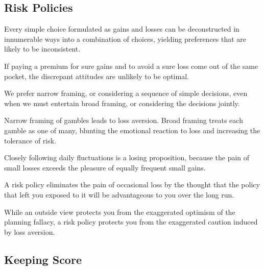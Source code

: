 \subsection*{Risk Policies}

\bit
\item Every simple choice formulated as gains and losses can be deconstructed in innumerable ways into a combination
of choices, yielding preferences that are likely to be inconsistent.
\item If paying a premium for sure gains and to avoid a sure loss come out of the same pocket, the discrepant
attitudes are unlikely to be optimal.
\item We prefer narrow framing, or considering a sequence of simple decisions, even when we must entertain broad
framing, or considering the decisions jointly.
\item Narrow framing of gambles leads to loss aversion. Broad framing treats each gamble as one of many, blunting the
emotional reaction to loss and increasing the tolerance of risk.
\item Closely following daily fluctuations is a losing proposition, because the pain of small losses exceeds the
pleasure of equally frequent small gains.
\item A risk policy eliminates the pain of occasional loss by the thought that the policy that left you exposed to it
will be advantageous to you over the long run.
\item While an outside view protects you from the exaggerated optimism of the planning fallacy, a risk policy
protects you from the exaggerated caution induced by loss aversion.
\eit

\subsection*{Keeping Score}

